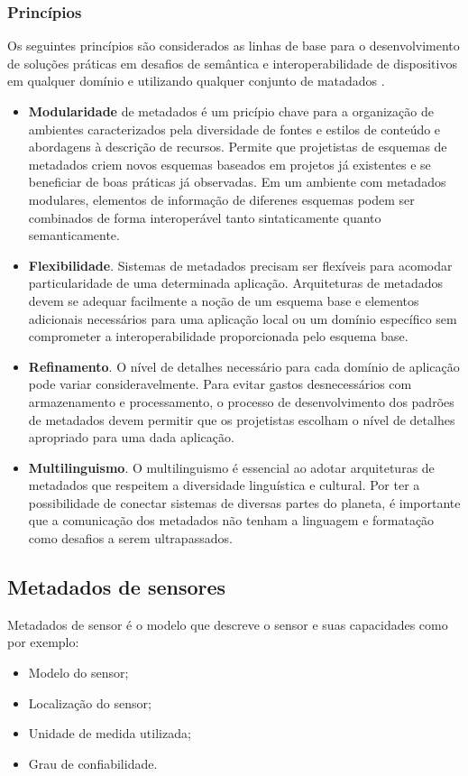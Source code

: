 		\subsubsection{Princípios}
    \quad Os seguintes princípios são considerados as linhas de base para o desenvolvimento de soluções práticas em desafios de semântica
    e interoperabilidade de dispositivos em qualquer domínio e utilizando qualquer conjunto de matadados \cite{metadata}.
		\begin{itemize}
		  \item \textbf{Modularidade} de metadados é um pricípio chave para a organização de ambientes caracterizados pela diversidade de fontes e estilos
      de conteúdo e abordagens à descrição de recursos. Permite que projetistas de esquemas de metadados criem novos esquemas baseados em projetos
      já existentes e se beneficiar de boas práticas já observadas. Em um ambiente com metadados modulares, elementos de informação de diferenes esquemas
      podem ser combinados de forma interoperável tanto sintaticamente quanto semanticamente.
      \item \textbf{Flexibilidade}. Sistemas de metadados precisam ser flexíveis para acomodar particularidade de uma determinada aplicação.
      Arquiteturas de metadados devem se adequar facilmente a noção de um esquema base e elementos adicionais necessários para uma aplicação local ou um
      domínio específico sem comprometer a interoperabilidade proporcionada pelo esquema base.
      \item \textbf{Refinamento}. O nível de detalhes necessário para cada domínio de aplicação pode variar consideravelmente. Para evitar gastos
      desnecessários com armazenamento e processamento, o processo de desenvolvimento dos padrões de metadados devem permitir que os projetistas
      escolham o nível de detalhes apropriado para uma dada aplicação.
      \item \textbf{Multilinguismo}. O multilinguismo é essencial ao adotar arquiteturas de metadados que respeitem a diversidade linguística e cultural.
      Por ter a possibilidade de conectar sistemas de diversas partes do planeta, é importante que a comunicação dos metadados não tenham a linguagem e formatação
      como desafios a serem ultrapassados.
		\end{itemize}
  \subsection{Metadados de sensores}
    \quad Metadados de sensor é o modelo que descreve o sensor e suas capacidades como por exemplo:
    \begin{itemize}
      \item Modelo do sensor;
      \item Localização do sensor;
      \item Unidade de medida utilizada;
      \item Grau de confiabilidade.
    \end{itemize}

